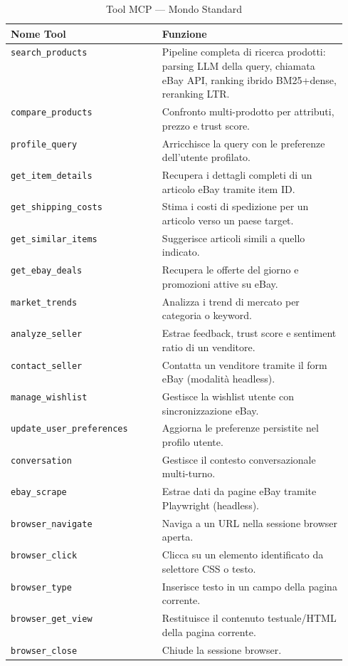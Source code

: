 \begin{table}[htbp]
\centering
\caption{Tool MCP — Mondo Standard}
\label{tab:mcp-tools-standard}
\begin{tabular}{lp{0.55\linewidth}}
\hline
\textbf{Nome Tool} & \textbf{Funzione} \\
\hline
\texttt{search\_products}       & Pipeline completa di ricerca prodotti: parsing LLM della query, chiamata eBay API, ranking ibrido BM25+dense, reranking LTR. \\
\texttt{compare\_products}      & Confronto multi-prodotto per attributi, prezzo e trust score. \\
\texttt{profile\_query}         & Arricchisce la query con le preferenze dell'utente profilato. \\
\texttt{get\_item\_details}     & Recupera i dettagli completi di un articolo eBay tramite item ID. \\
\texttt{get\_shipping\_costs}   & Stima i costi di spedizione per un articolo verso un paese target. \\
\texttt{get\_similar\_items}    & Suggerisce articoli simili a quello indicato. \\
\texttt{get\_ebay\_deals}       & Recupera le offerte del giorno e promozioni attive su eBay. \\
\texttt{market\_trends}         & Analizza i trend di mercato per categoria o keyword. \\
\texttt{analyze\_seller}        & Estrae feedback, trust score e sentiment ratio di un venditore. \\
\texttt{contact\_seller}        & Contatta un venditore tramite il form eBay (modalità headless). \\
\texttt{manage\_wishlist}       & Gestisce la wishlist utente con sincronizzazione eBay. \\
\texttt{update\_user\_preferences} & Aggiorna le preferenze persistite nel profilo utente. \\
\texttt{conversation}           & Gestisce il contesto conversazionale multi-turno. \\
\texttt{ebay\_scrape}           & Estrae dati da pagine eBay tramite Playwright (headless). \\
\texttt{browser\_navigate}      & Naviga a un URL nella sessione browser aperta. \\
\texttt{browser\_click}         & Clicca su un elemento identificato da selettore CSS o testo. \\
\texttt{browser\_type}          & Inserisce testo in un campo della pagina corrente. \\
\texttt{browser\_get\_view}     & Restituisce il contenuto testuale/HTML della pagina corrente. \\
\texttt{browser\_close}         & Chiude la sessione browser. \\
\hline
\end{tabular}
\end{table}


